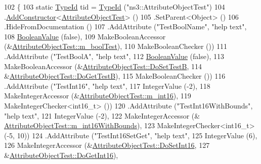 \begin{DoxyCode}
102                                  \{
103     \textcolor{keyword}{static} \hyperlink{classns3_1_1TypeId}{TypeId} tid = \hyperlink{classns3_1_1TypeId}{TypeId} (\textcolor{stringliteral}{"ns3::AttributeObjectTest"})
104       .\hyperlink{classns3_1_1TypeId_a06aaf693dc4dbe69b805d942c893ee64}{AddConstructor}<\hyperlink{classAttributeObjectTest}{AttributeObjectTest}> ()
105       .SetParent<Object> ()
106       .HideFromDocumentation ()
107       .AddAttribute (\textcolor{stringliteral}{"TestBoolName"}, \textcolor{stringliteral}{"help text"},
108                      \hyperlink{classns3_1_1BooleanValue}{BooleanValue} (\textcolor{keyword}{false}),
109                      MakeBooleanAccessor (&\hyperlink{classAttributeObjectTest_a0bec303f1c438a7f6d867e3cdeb0807f}{AttributeObjectTest::m\_boolTest}),
110                      MakeBooleanChecker ())
111       .AddAttribute (\textcolor{stringliteral}{"TestBoolA"}, \textcolor{stringliteral}{"help text"},
112                      \hyperlink{classns3_1_1BooleanValue}{BooleanValue} (\textcolor{keyword}{false}),
113                      MakeBooleanAccessor (&\hyperlink{classAttributeObjectTest_ae4ca4fee1e918fa8865bcaee282e6233}{AttributeObjectTest::DoSetTestB},
114                                           &\hyperlink{classAttributeObjectTest_a0f2e2ca94ae7716ca98810b86e3096c5}{AttributeObjectTest::DoGetTestB}),
115                      MakeBooleanChecker ())
116       .AddAttribute (\textcolor{stringliteral}{"TestInt16"}, \textcolor{stringliteral}{"help text"},
117                      IntegerValue (-2),
118                      MakeIntegerAccessor (&\hyperlink{classAttributeObjectTest_a33942d25e282109f9717ba0a559277af}{AttributeObjectTest::m\_int16}),
119                      MakeIntegerChecker<int16\_t> ())
120       .AddAttribute (\textcolor{stringliteral}{"TestInt16WithBounds"}, \textcolor{stringliteral}{"help text"},
121                      IntegerValue (-2),
122                      MakeIntegerAccessor (&
      \hyperlink{classAttributeObjectTest_a93968ba47eb5db65b4689fb8567c7e5f}{AttributeObjectTest::m\_int16WithBounds}),
123                      MakeIntegerChecker<int16\_t> (-5, 10))
124       .AddAttribute (\textcolor{stringliteral}{"TestInt16SetGet"}, \textcolor{stringliteral}{"help text"},
125                      IntegerValue (6),
126                      MakeIntegerAccessor (&\hyperlink{classAttributeObjectTest_af4dd6bc3d3d113055b37cb7d4e1b3e8f}{AttributeObjectTest::DoSetInt16},
127                                           &\hyperlink{classAttributeObjectTest_aab433f15a9f44011ee682d5ede72f19a}{AttributeObjectTest::DoGetInt16}),

\end{DoxyCode}
